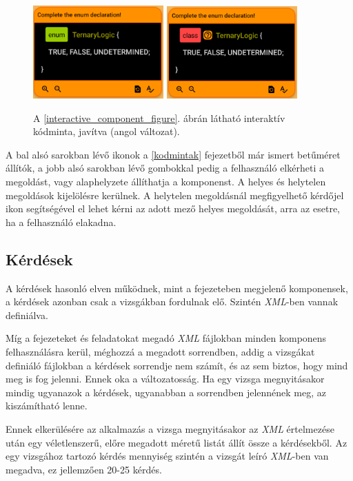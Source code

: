 \documentclass[12pt,a4paper]{article}
\newcommand{\xml}{\textit{XML}\xspace}
\begin{document}
	\begin{figure}
		\centering
		\includegraphics[width=5cm]{interactive_correct}
		\includegraphics[width=5cm]{interactive_incorrect}
		\caption{A \ref{interactive_component_figure}. ábrán látható interaktív kódminta, javítva (angol változat).}
		\label{interactive_component_completed_figure}
	\end{figure}
	
	A bal alsó sarokban lévő ikonok a \ref{kodmintak} fejezetből már ismert betűméret állítók, a jobb alsó sarokban lévő gombokkal pedig a felhasználó elkérheti a megoldást, vagy alaphelyzete állíthatja a komponenst. A helyes és helytelen megoldások kijelölésre kerülnek. A helytelen megoldásnál megfigyelhető kérdőjel ikon segítségével el lehet kérni az adott mező helyes megoldását, arra az esetre, ha a felhasználó elakadna.
	
	\subsection{Kérdések}\label{kerdesek}
	
	A kérdések hasonló elven működnek, mint a fejezeteben megjelenő komponensek, a kérdések azonban csak a vizsgákban fordulnak elő. Szintén \xml-ben vannak definiálva.
	
	Míg a fejezeteket és feladatokat megadó \xml fájlokban minden komponens felhasználásra kerül, méghozzá a megadott sorrendben, addig a vizsgákat definiáló fájlokban a kérdések sorrendje nem számít, és az sem biztos, hogy mind meg is fog jelenni. Ennek oka a változatosság. Ha egy vizsga megnyitásakor mindig ugyanazok a kérdések, ugyanabban a sorrendben jelennének meg, az kiszámítható lenne.
	
	Ennek elkerülésére az alkalmazás a vizsga megnyitásakor az \xml értelmezése után egy véletlenszerű, előre megadott méretű listát állít össze a kérdésekből. Az egy vizsgához tartozó kérdés mennyiség szintén a vizsgát leíró \xml-ben van megadva, ez jellemzően 20-25 kérdés.
	
\end{document}

